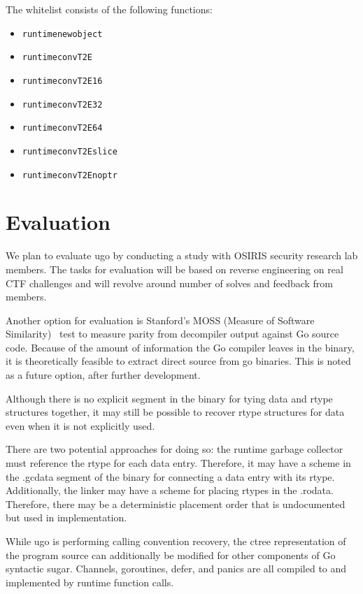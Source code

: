 \documentclass[letterpaper,twocolumn,10pt]{article}
\begin{document}
    The whitelist consists of the following functions:
\begin{itemize}
\item \texttt{runtime\-newobject}
\item \texttt{runtime\-convT2E}
\item \texttt{runtime\-convT2E16}
\item \texttt{runtime\-convT2E32}
\item \texttt{runtime\-convT2E64}
\item \texttt{runtime\-convT2Eslice}
\item \texttt{runtime\-convT2Enoptr}
\end{itemize}

\section{Evaluation}
    We plan to evaluate ugo by conducting a study with OSIRIS security research lab members. The tasks for evaluation will be based on reverse engineering on real CTF challenges and will revolve around number of solves and feedback from members.

    Another option for evaluation is Stanford’s MOSS (Measure of Software Similarity)~\cite{moss} test to measure parity from decompiler output against Go source code. Because of the amount of information the Go compiler leaves in the binary, it is theoretically feasible to extract direct source from go binaries. This is noted as a future option, after further development.

    Although there is no explicit segment in the binary for tying data and rtype structures together, it may still be possible to recover rtype structures for data even when it is not explicitly used.

There are two potential approaches for doing so: the runtime garbage collector must reference the rtype for each data entry. Therefore, it may have a scheme in the .gcdata segment of the binary for connecting a data entry with its rtype. Additionally, the linker may have a scheme for placing rtypes in the .rodata. Therefore, there may be a deterministic placement order that is undocumented but used in implementation.

While ugo is performing calling convention recovery, the ctree representation of the program source can additionally be modified for other components of Go syntactic sugar. Channels, goroutines, defer, and panics are all compiled to and implemented by runtime function calls.
\end{document}
